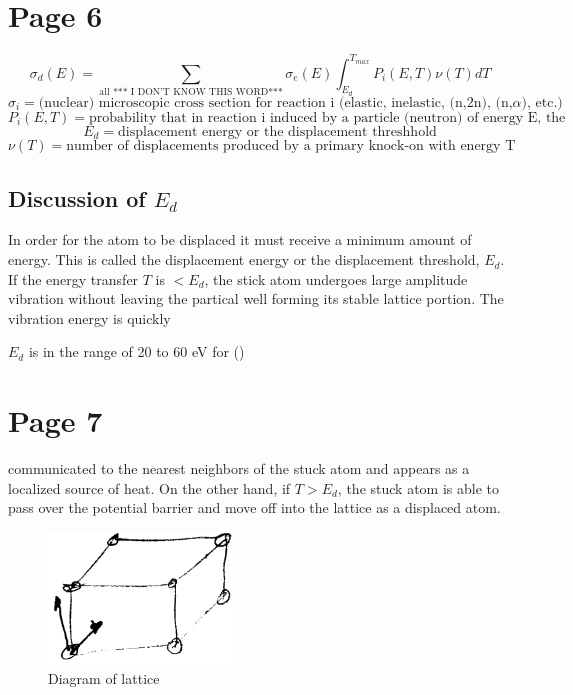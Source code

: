 \documentclass[11pt]{report} %
\newcommand{\IDK}{*** I DON'T KNOW THIS WORD***}
\begin{document}
\section{Page 6}
\begin{equation}
	\sigma_d(E) = \sum_{\text{all \IDK}} \sigma_e (E) \int_{E_d}^{T_{max}} P_i(E,T) \nu(T) dT
\end{equation}
\begin{equation}
	\sigma_i = \text{(nuclear) microscopic cross section for reaction i (elastic, inelastic, (n,2n), (n,$\alpha$), etc.)}
\end{equation}
\begin{equation}
	P_i(E,T) = \text{probability that in reaction i induced by a particle (neutron) of energy E, the PKA has a kinetic energy T}
\end{equation}
\begin{equation}
	E_d = \text{displacement energy or the displacement threshhold}
\end{equation}
\begin{equation}
	\nu(T) = \text{number of displacements produced by a primary knock-on with energy T}
\end{equation}

\subsection{Discussion of \texorpdfstring{$E_d$}{}}
In order for the atom to be displaced it must receive a minimum amount of energy. This is called the displacement energy or the displacement threshold, $E_d$. If the energy transfer $T$ is $<E_d$, the stick atom undergoes large amplitude vibration without leaving the partical well forming its stable lattice portion. The vibration energy is quickly

$E_d$ is in the range of 20 to 60 eV for ()

\section{Page 7}
communicated to the nearest neighbors of the stuck atom and appears as a localized source of heat. On the other hand, if $T>E_d$, the stuck atom is able to pass over the potential barrier and move off into the lattice as a displaced atom.

\begin{figure}
  \begin{center}
  \includegraphics[width=0.45\textwidth]{sketches/sketch2.png}
  \end{center}
  \caption{Diagram of lattice}
\end{figure}
\end{document}
